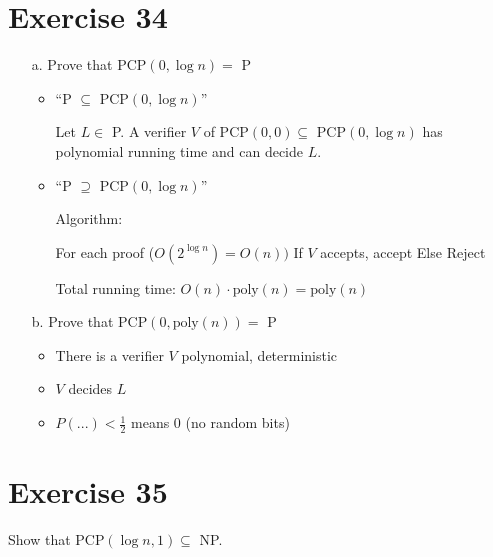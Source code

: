\documentclass[11pt]{article}
\theoremstyle{definition}
\theoremstyle{definition}
\begin{document}
\section*{Exercise 34}

\begin{enumerate}
\item[a.] Prove that PCP$(0, \log n) = $ P
		
	\begin{itemize}
	\item ``P $ \subseteq $ PCP$(0, \log n) $'' \newline
	
		Let $ L \in $ P. A verifier $ V $ of PCP$(0, 0) \subseteq $ PCP$(0, \log n) $ has polynomial running time and can decide $ L $.
	
	\item ``P $ \supseteq $ PCP$(0, \log n) $'' \newline
	
	Algorithm:
	
		For each proof ($ O(2^{\log n}) = O(n)) $
			If $ V $ accepts, accept
		Else
			Reject
			
	Total running time: $ O(n) \cdot \text{poly}(n) = \text{poly}(n) $
	\end{itemize}

\item[b.] Prove that PCP$(0, \text{poly}( n)) = $ P
	\begin{itemize}
	\item There is a verifier $ V $ polynomial, deterministic
	\item $ V $ decides $ L $
	\item $ P(...) < \frac{1}{2} $ means 0 (no random bits)
	\end{itemize}

\end{enumerate}


\section*{Exercise 35}

Show that PCP$(\log n, 1) \subseteq $ NP.
\end{document}
